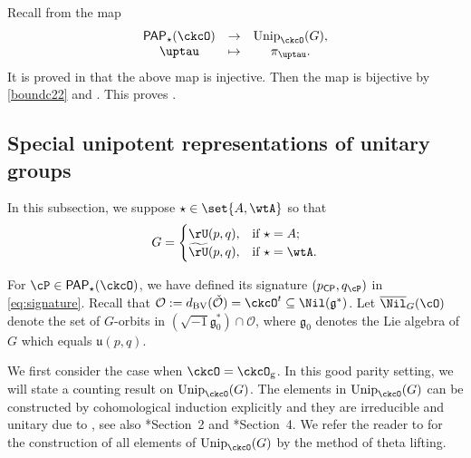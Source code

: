 \documentclass[12pt,a4paper]{amsart}
\newcommand{\trivial}[2][]{\if\relax\detokenize{#1}\relax
  {%
      \color{orange} \vspace{0em} $[$  #2 $]$
      \color{black}
  }
  \else
\ifx#1h
\ifcsname showtrivial\endcsname
{%
    \color{orange} \vspace{0em}  $[$ #2 $]$
    \color{black}
}
\fi
\else {\red Wrong argument!} \fi
\fi
}
\def\subset{\subseteq}
\def\Im{\operatorname{Im}}
\newcommand{\CO}{{\mathcal {O}}}
\newcommand{\CP}{{\mathcal {P}}}
\newcommand{\g}{\mathfrak g}
\renewcommand{\u}{\mathfrak u}
\numberwithin{equation}{section}
\theoremstyle{remark}
\def\Unip{\mathrm{Unip}}
\def\dBV{d_{\mathrm{BV}}}
\def\CP{\mathsf{CP}}
\def\Cint#1{\Coh_{[#1]}}
\def\PP{\mathsf{PAP}}
\def\tU{\widetilde{\rU}}
\def\Im{\mathrm{Im}}
\def\Coh{\mathrm{Coh}}
\begin{document}
Recall from  the map
  \[
    \begin{array}{ccc}
      \PP_{\star}(\ckcO) & \rightarrow & \Unip_{\ckcO}(G),\\
      \uptau & \mapsto & \pi_{\uptau}.
    \end{array}
  \]
 It  is proved in  \cite[Theorem 3.8]{V.GL} that the above map is injective. Then   the map is bijective by \eqref{boundc22} and . This proves  .

\subsection{Special unipotent representations of unitary groups}\label{secunit}

In this subsection, we suppose  $\star \in \set{A, \wtA}$ so that
\[
  G =
  \begin{cases}
    \rU(p,q),  & \text{if }\star = A;\\
    \tU(p,q),  & \text{if }\star = \wtA.
\end{cases}
\]


For $\cP \in \PP_{\star}(\ckcO)$, we have defined its signature $(p_\CP, q_\cP)$ in \eqref{eq:signature}. Recall that $\CO:=\dBV(\check \CO)=\ckcO^t\subset \Nil(\g^*)$.  Let $\overline \Nil_{G}(\cO)$ denote the set of $G$-orbits in $(\sqrt{-1}\g_0^*)\cap \CO$, where $\g_0$ denotes the Lie algebra of $G$ which equals $\u(p,q)$.

We first consider the case when  $\ckcO = \ckcO_{\mathrm g}$.
In this good parity setting, we will state a counting result on
$\Unip_{\ckcO}(G)$. The elements in $\Unip_{\ckcO}(G)$ can be constructed by
cohomological induction explicitly and they are irreducible and unitary due to
\cite{Mat96,Tr.U}, see also \cite{Tr.H}*{Section~2} and \cite{MR.U}*{Section~4}.
We refer the reader to \cite{BMSZ2} for the construction of all elements of $\Unip_{\ckcO}(G)$ by the method of theta lifting.
\end{document}
